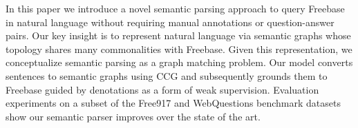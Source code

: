 In this paper we introduce a novel semantic parsing approach to query Freebase in natural language without requiring manual annotations or question-answer pairs. Our key insight is to represent natural language via semantic graphs whose topology shares many commonalities with Freebase. Given this representation, we conceptualize semantic parsing as a graph matching problem. Our model converts sentences to semantic graphs using CCG and subsequently grounds them to Freebase guided by denotations as a form of weak supervision. Evaluation experiments on a subset of the Free917 and WebQuestions benchmark datasets show our semantic parser improves over the state of the art.